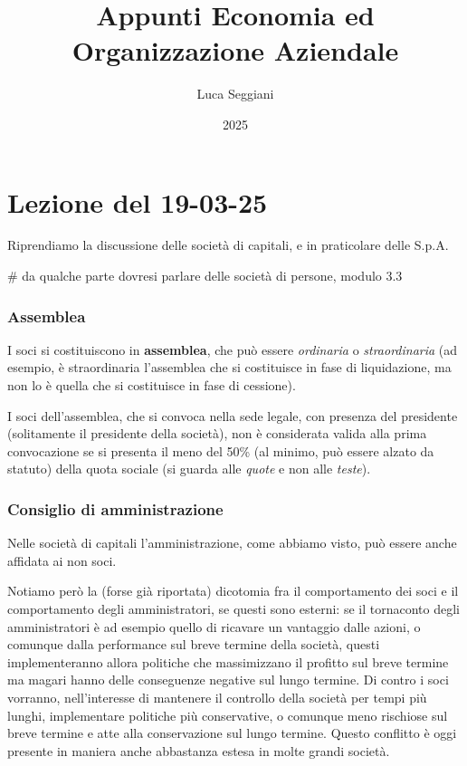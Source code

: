 \documentclass[a4paper,11pt]{article}
\title{Appunti Economia ed Organizzazione Aziendale}
\author{Luca Seggiani}
\date{2025}
\begin{document}
\section{Lezione del 19-03-25}

\thispagestyle{empty}
\pagestyle{fancy}

Riprendiamo la discussione delle società di capitali, e in praticolare delle S.p.A.

# da qualche parte dovresi parlare delle società di persone, modulo 3.3

\subsubsection{Assemblea}
I soci si costituiscono in \textbf{assemblea}, che può essere \textit{ordinaria} o \textit{straordinaria} (ad esempio, è straordinaria l'assemblea che si costituisce in fase di liquidazione, ma non lo è quella che si costituisce in fase di cessione).

I soci dell'assemblea, che si convoca nella sede legale, con presenza del presidente (solitamente il presidente della società), non è considerata valida alla prima convocazione se si presenta il meno del 50\% (al minimo, può essere alzato da statuto) della quota sociale (si guarda alle \textit{quote} e non alle \textit{teste}).

\subsubsection{Consiglio di amministrazione}
Nelle società di capitali l'amministrazione, come abbiamo visto, può essere anche affidata ai non soci.

Notiamo però la (forse già riportata) dicotomia fra il comportamento dei soci e il comportamento degli amministratori, se questi sono esterni: se il tornaconto degli amministratori è ad esempio quello di ricavare un vantaggio dalle azioni, o comunque dalla performance sul breve termine della società, questi implementeranno allora politiche che massimizzano il profitto sul breve termine ma magari hanno delle conseguenze negative sul lungo termine.
Di contro i soci vorranno, nell'interesse di mantenere il controllo della società per tempi più lunghi, implementare politiche più conservative, o comunque meno rischiose sul breve termine e atte alla conservazione sul lungo termine.
Questo conflitto è oggi presente in maniera anche abbastanza estesa in molte grandi società.
\end{document}
